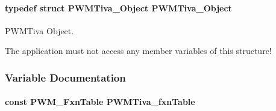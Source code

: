 \paragraph[{P\-W\-M\-Tiva\-\_\-\-Object}]{\setlength{\rightskip}{0pt plus 5cm}typedef struct {\bf P\-W\-M\-Tiva\-\_\-\-Object}  {\bf P\-W\-M\-Tiva\-\_\-\-Object}}\label{_p_w_m_tiva_8h_a6a177b361dfd0da20d6fa735b680b5c5}


P\-W\-M\-Tiva Object. 

The application must not access any member variables of this structure! 

\subsubsection{Variable Documentation}
\paragraph[{P\-W\-M\-Tiva\-\_\-fxn\-Table}]{\setlength{\rightskip}{0pt plus 5cm}const {\bf P\-W\-M\-\_\-\-Fxn\-Table} P\-W\-M\-Tiva\-\_\-fxn\-Table}\label{_p_w_m_tiva_8h_ae9b8f538f1e9e857629220104addd24a}
